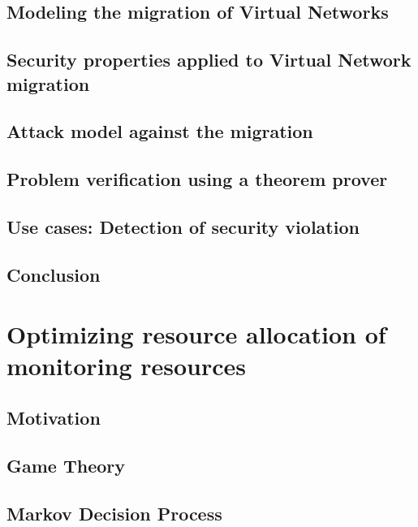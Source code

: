 \documentclass[a4paper, 11pt]{article}
\begin{document}
\subsection{Modeling the migration of Virtual Networks}


\subsection{Security properties applied to Virtual Network migration}


\subsection{Attack model against the migration}


\subsection{Problem verification using a theorem prover}


\subsection{Use cases: Detection of security violation}


\newpage
\subsection{Conclusion}


\newpage
\section{Optimizing resource allocation of monitoring resources}
\label{sec:RAprob}
\subsection{Motivation}




\newpage
\subsection{Game Theory}


\newpage
\subsection{Markov Decision Process}


\newpage

\label{sec:thesis_conclusion}
\newpage
{}


\newpage
\begin{appendices}

\newpage

\newpage

\end{appendices}
\end{document}
